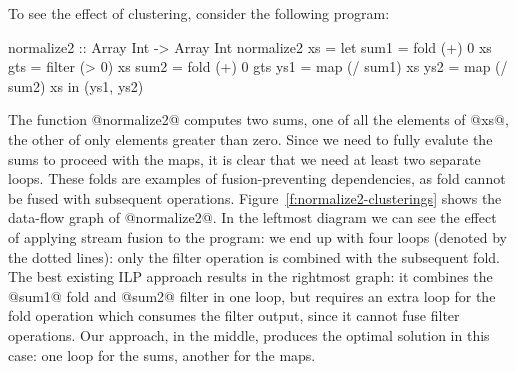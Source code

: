 To see the effect of clustering, consider the following program:
\begin{code}
 normalize2 :: Array Int -> Array Int
 normalize2 xs
  = let sum1 = fold   (+)  0   xs
        gts  = filter (>   0)  xs
        sum2 = fold   (+)  0   gts
        ys1  = map    (/ sum1) xs
        ys2  = map    (/ sum2) xs
    in (ys1, ys2)
\end{code}

The function @normalize2@ computes two sums, one of all the elements of @xs@, the other of only elements greater than zero. Since we need to fully evalute the sums to proceed with the maps, it is clear that we need at least two separate loops. These folds are examples of fusion-preventing dependencies, as fold cannot be fused with subsequent operations. Figure~\ref{f:normalize2-clusterings} shows the data-flow graph of @normalize2@. In the leftmost diagram we can see the effect of applying stream fusion to the program: we end up with four loops (denoted by the dotted lines): only the filter operation is combined with the subsequent fold. The best existing ILP approach results in the rightmost graph: it combines the @sum1@ fold and @sum2@ filter in one loop, but requires an extra loop for the fold operation which consumes the filter output, since it cannot fuse filter operations. Our approach, in the middle, produces the optimal solution in this case: one loop for the sums, another for the maps.


